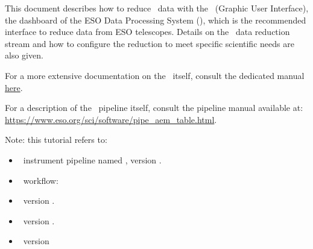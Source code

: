 This document describes how to reduce \instname\ data with
the \edpsgui\ (Graphic User Interface), the dashboard  of the ESO Data
Processing System (\edps), which is the recommended interface to reduce
data from ESO telescopes.
Details on the \instname\ data reduction stream and how to configure
the reduction to meet specific scientific needs are also given.


For a more extensive documentation on the \edpsgui\ itself, consult
the dedicated
manual \href{https://edps.readthedocs.io/en/latest/edpsgui/index.html}{here}.

For a description of the \instname\ pipeline itself, consult the pipeline manual available at:\\
\href{https://www.eso.org/sci/software/pipe_aem_table.html}{https://www.eso.org/sci/software/pipe\_aem\_table.html}.

Note: this tutorial refers to:
\begin{itemize}
\item \instname\ instrument pipeline named \pipename,
version \pipelinevers.
\item \instname\ workflow: \wkfname
\item \edps\ version \edpsversion.
\item \edpsgui\ version \edpsguiversion.
\item \edpsplot\ version \edpsplotversion

\end{itemize}
